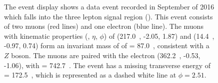 \begin{figure}[ht]
    \centering
    \caption[Event display for data event in the \SRThree signal region]{The event display shows a data event recorded in September of 2016 which falls into the three lepton signal region (\SRThree). This event consists of two muons (red lines) and one electron (blue line).
    The muons with kinematic properties (\pt, $\eta$, $\phi$) of (217.0~\GeV, -2.05, 1.87) and (14.4~\GeV, -0.97, 0.74) form an invariant mass of of \mll= 87.0~\GeV, consistent with a $Z$ boson.
    The muons are paired with the electron (362.2~\GeV, -0.53, -1.06), with \mZl=  742.7~\GeV.
    The event has a missing transverse energy of \met= 172.5~\GeV, which is represented as a dashed white line at $\phi=2.51$. \cite{ATLAS:2020uer}}
    \label{fig:eventdisplaySR3l}
\end{figure}